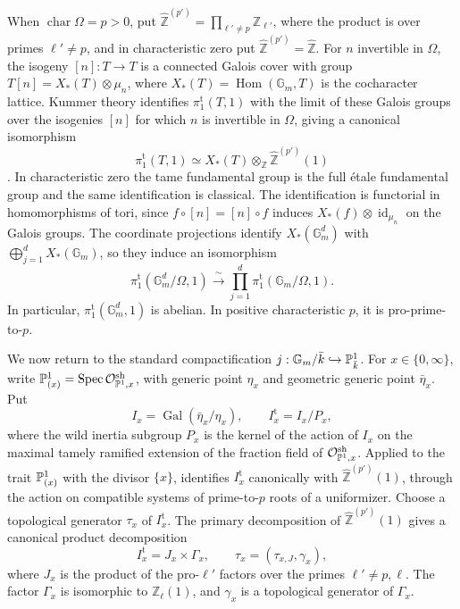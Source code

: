 \documentclass[12pt,reqno]{amsart}
\theoremstyle{definition}
\theoremstyle{plain}
\theoremstyle{definition}
\theoremstyle{remark}
\newcommand{\bbG}{\mathbb{G}}  \newcommand{\bbH}{\mathbb{H}}
\newcommand{\Gm}{\bbG_m}
\begin{document}
When \(\operatorname{char}\Omega=p>0\), put
\(\widehat{\mathbb Z}^{(p')}=\prod_{\ell'\ne p}\mathbb Z_{\ell'}\), where the product is over primes
\(\ell'\ne p\), and in characteristic zero put
\(\widehat{\mathbb Z}^{(p')}=\widehat{\mathbb Z}\).  For \(n\) invertible in \(\Omega\), the isogeny
\([n]:T\to T\) is a connected Galois cover with group \(T[n]=X_*(T)\otimes\mu_n\), where
\(X_*(T)=\operatorname{Hom}(\Gm,T)\) is the cocharacter lattice.  Kummer theory identifies
\(\pi_1^{\mathrm t}(T,1)\) with the limit of these Galois groups over the isogenies \([n]\) for which
\(n\) is invertible in \(\Omega\), giving a canonical isomorphism
\[
        \pi_1^{\mathrm t}(T,1)
        \simeq X_*(T)\otimes_{\mathbb Z}\widehat{\mathbb Z}^{(p')}(1)
\]
\cite[\S1.3]{GabberLoeser1996}.  In characteristic zero the tame fundamental group is the full \'etale
fundamental group and the same identification is classical.  The identification is functorial in
homomorphisms of tori, since \(f\circ[n]=[n]\circ f\) induces \(X_*(f)\otimes\operatorname{id}_{\mu_n}\)
on the Galois groups.  The coordinate projections identify \(X_*(\Gm^d)\) with
\(\bigoplus_{j=1}^dX_*(\Gm)\), so they induce an isomorphism
\begin{equation}
\label{eq:tame-product}
        \pi_1^{\mathrm t}(\Gm^d/\Omega,1)
        \xrightarrow{\ \sim\ }
        \prod_{j=1}^d\pi_1^{\mathrm t}(\Gm/\Omega,1).
\end{equation}
In particular, \(\pi_1^{\mathrm t}(\Gm^d,1)\) is abelian.  In positive characteristic \(p\), it is
pro-prime-to-\(p\).

We now return to the standard compactification \(j:\Gm/\bar k\hookrightarrow\bbP^1_{\bar k}\).  For
\(x\in\{0,\infty\}\), write
\(\mathbb{P}^1_{(x)}=\operatorname{Spec}\mathcal O^{\mathrm{sh}}_{\mathbb{P}^1,x}\), with generic point
\(\eta_x\) and geometric generic point \(\bar\eta_x\).  Put
\[
        I_x=\operatorname{Gal}(\bar\eta_x/\eta_x),
        \qquad
        I_x^{\mathrm t}=I_x/P_x,
\]
where the wild inertia subgroup \(P_x\) is the kernel of the action of \(I_x\) on the
maximal tamely ramified extension of the fraction field of
\(\mathcal O^{\mathrm{sh}}_{\mathbb{P}^1,x}\).  Applied to the trait \(\mathbb{P}^1_{(x)}\) with the
divisor \(\{x\}\), \cite[Exp.~XIII, Cor.~5.3]{SGA1} identifies \(I_x^{\mathrm t}\)
canonically with \(\widehat{\mathbb Z}^{(p')}(1)\), through the action on compatible systems of
prime-to-\(p\) roots of a uniformizer.  Choose a topological generator \(\tau_x\) of
\(I_x^{\mathrm t}\).  The primary decomposition of \(\widehat{\mathbb Z}^{(p')}(1)\) gives a canonical
product decomposition
\[
        I_x^{\mathrm t}=J_x\times\Gamma_x,
        \qquad
        \tau_x=(\tau_{x,J},\gamma_x),
\]
where \(J_x\) is the product of the pro-\(\ell'\) factors over the primes \(\ell'\neq p,\ell\).  The
factor \(\Gamma_x\) is isomorphic to \(\mathbb Z_\ell(1)\), and \(\gamma_x\) is a topological generator
of \(\Gamma_x\).
\end{document}

